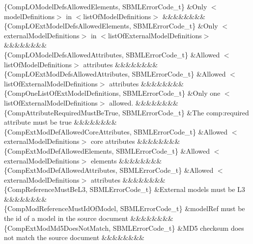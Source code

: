 \begin{DoxyParagraph}{}
\begin{longtabu}
\{Comp\+L\+O\+Model\+Defs\+Allowed\+Elements, S\+B\+M\+L\+Error\+Code\+\_\+t\} &Only {\ttfamily $<$model\+Definitions$>$} in {\ttfamily $<$list\+Of\+Model\+Definitions$>$} &&&&&&&&\\
\{Comp\+L\+O\+Ext\+Model\+Defs\+Allowed\+Elements, S\+B\+M\+L\+Error\+Code\+\_\+t\} &Only {\ttfamily $<$external\+Model\+Definitions$>$} in {\ttfamily $<$list\+Of\+External\+Model\+Definitions$>$} &&&&&&&&\\
\{Comp\+L\+O\+Model\+Defs\+Allowed\+Attributes, S\+B\+M\+L\+Error\+Code\+\_\+t\} &Allowed {\ttfamily $<$list\+Of\+Model\+Definitions$>$} attributes &&&&&&&&\\
\{Comp\+L\+O\+Ext\+Mod\+Defs\+Allowed\+Attributes, S\+B\+M\+L\+Error\+Code\+\_\+t\} &Allowed {\ttfamily $<$list\+Of\+External\+Model\+Definitions$>$} attributes &&&&&&&&\\
\{Comp\+One\+List\+Of\+Ext\+Model\+Definitions, S\+B\+M\+L\+Error\+Code\+\_\+t\} &Only one {\ttfamily $<$list\+Of\+External\+Model\+Definitions$>$} allowed. &&&&&&&&\\
\{Comp\+Attribute\+Required\+Must\+Be\+True, S\+B\+M\+L\+Error\+Code\+\_\+t\} &The comp\+:required attribute must be \textquotesingle{}true\textquotesingle{} &&&&&&&&\\
\{Comp\+Ext\+Mod\+Def\+Allowed\+Core\+Attributes, S\+B\+M\+L\+Error\+Code\+\_\+t\} &Allowed {\ttfamily $<$external\+Model\+Definitions$>$} core attributes &&&&&&&&\\
\{Comp\+Ext\+Mod\+Def\+Allowed\+Elements, S\+B\+M\+L\+Error\+Code\+\_\+t\} &Allowed {\ttfamily $<$external\+Model\+Definitions$>$} elements &&&&&&&&\\
\{Comp\+Ext\+Mod\+Def\+Allowed\+Attributes, S\+B\+M\+L\+Error\+Code\+\_\+t\} &Allowed {\ttfamily $<$external\+Model\+Definitions$>$} attributes &&&&&&&&\\
\{Comp\+Reference\+Must\+Be\+L3, S\+B\+M\+L\+Error\+Code\+\_\+t\} &External models must be L3 &&&&&&&&\\
\{Comp\+Mod\+Reference\+Must\+Id\+Of\+Model, S\+B\+M\+L\+Error\+Code\+\_\+t\} &\textquotesingle{}model\+Ref\textquotesingle{} must be the \textquotesingle{}id\textquotesingle{} of a model in the \textquotesingle{}source\textquotesingle{} document &&&&&&&&\\
\{Comp\+Ext\+Mod\+Md5\+Does\+Not\+Match, S\+B\+M\+L\+Error\+Code\+\_\+t\} &M\+D5 checksum does not match the \textquotesingle{}source\textquotesingle{} document &&&&&&&&\\

\end{longtabu}
\end{DoxyParagraph}
